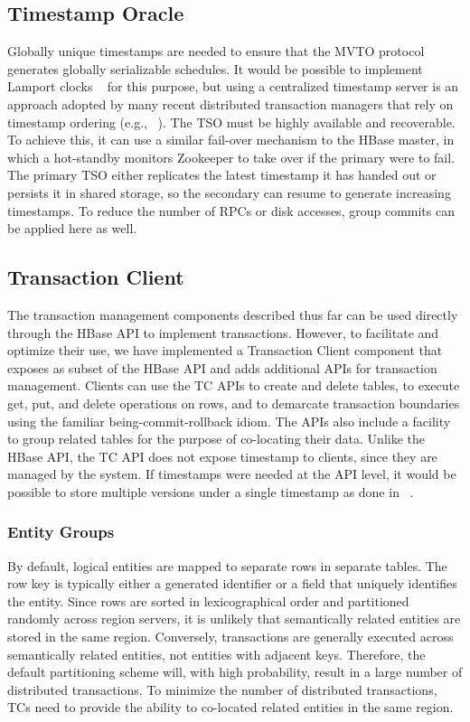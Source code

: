 \documentclass[10pt,final,journal]{IEEEtran}
\begin{document}
\subsection{Timestamp Oracle}
Globally unique timestamps are needed to ensure that the MVTO protocol generates globally serializable schedules. It would be possible to implement Lamport clocks ~\cite{Lamport:1978:TCO:359545.359563} for this purpose, but using a centralized timestamp server is an approach adopted by many recent distributed transaction managers that rely on timestamp ordering (e.g., ~\cite{Peng:2010:LIP:1924943.1924961, Wei:2011:5740834}). The TSO must be highly available and recoverable. To achieve this, it can use a similar fail-over mechanism to the HBase master, in which a hot-standby monitors Zookeeper to take over if the primary were to fail. The primary TSO either replicates the latest timestamp it has handed out or persists it in shared storage, so the secondary can resume to generate increasing timestamps. To reduce the number of RPCs or disk accesses, group commits can be applied here as well.

\subsection{Transaction Client}
The transaction management components described thus far can be used directly through the HBase API to implement transactions. However, to facilitate and optimize their use, we have implemented a Transaction Client component that exposes as subset of the HBase API and adds additional APIs for transaction management. Clients can use the TC APIs to create and delete tables, to execute get, put, and delete operations on rows, and to demarcate transaction boundaries using the familiar being-commit-rollback idiom. The APIs also include a facility to group related tables for the purpose of co-locating their data. Unlike the HBase API, the TC API does not expose timestamp to clients, since they are managed by the system. If timestamps were needed at the API level, it would be possible to store multiple versions under a single timestamp as done in ~\cite{Peng:2010:LIP:1924943.1924961}.

\subsubsection{Entity Groups}
By default, logical entities are mapped to separate rows in separate tables. The row key is typically either a generated identifier or a field that uniquely identifies the entity. Since rows are sorted in lexicographical order and partitioned randomly across region servers, it is unlikely that semantically related entities are stored in the same region. Conversely, transactions are generally executed across semantically related entities, not entities with adjacent keys. Therefore, the default partitioning scheme will, with high probability, result in a large number of distributed transactions. To minimize the number of distributed transactions, TCs need to provide the ability to co-located related entities in the same region.
\end{document}
